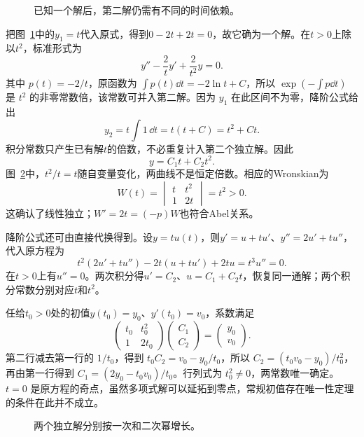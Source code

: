 \begin{figure}[H]\centering
{}
\caption{已知一个解后，第二解仍需有不同的时间依赖。}\label{fig:c2-h19-q}
\end{figure}
\begin{solution}
把图~\ref{fig:c2-h19-q}中的$y_1=t$代入原式，得到$0-2t+2t=0$，故它确为一个解。在$t>0$上除以$t^2$，标准形式为
\[y''-\frac2t y'+\frac2{t^2}y=0.\]
其中 $p(t)=-2/t$，原函数为 $\int p(t)\dd t=-2\ln t+C$，所以 $\exp(-\int p\dd t)$ 是 $t^2$ 的非零常数倍，该常数可并入第二解。因为 $y_1$ 在此区间不为零，降阶公式给出
\[y_2=t\int1\,\dd t=t(t+C)=t^2+Ct.
\]
积分常数只产生已有解$t$的倍数，不必重复计入第二个独立解。因此
\[\boxed{y=C_1t+C_2t^2}.
\]
图~\ref{fig:c2-h19-s}中，$t^2/t=t$随自变量变化，两曲线不是恒定倍数。相应的Wronskian为
\[W(t)=\begin{vmatrix}t&t^2\\1&2t\end{vmatrix}=t^2>0.\]
这确认了线性独立；$W'=2t=(-p)W$也符合Abel关系。

降阶公式还可由直接代换得到。设$y=tu(t)$，则$y'=u+tu'$、$y''=2u'+tu''$，代入原方程为
\[t^2(2u'+tu'')-2t(u+tu')+2tu=t^3u''=0.\]
在$t>0$上有$u''=0$。两次积分得$u'=C_2$、$u=C_1+C_2t$，恢复同一通解；两个积分常数分别对应$t$和$t^2$。

任给$t_0>0$处的初值$y(t_0)=y_0$、$y'(t_0)=v_0$，系数满足
\[\begin{pmatrix}t_0&t_0^2\\1&2t_0\end{pmatrix}
\begin{pmatrix}C_1\\C_2\end{pmatrix}=\begin{pmatrix}y_0\\v_0\end{pmatrix}.\]
第二行减去第一行的 $1/t_0$，得到 $t_0C_2=v_0-y_0/t_0$，所以 $C_2=(t_0v_0-y_0)/t_0^2$，再由第一行得到 $C_1=(2y_0-t_0v_0)/t_0$。行列式为 $t_0^2\ne0$，两常数唯一确定。$t=0$ 是原方程的奇点，虽然多项式解可以延拓到零点，常规初值存在唯一性定理的条件在此并不成立。

\begin{figure}[H]\centering
{}
\caption{两个独立解分别按一次和二次幂增长。}\label{fig:c2-h19-s}
\end{figure}
\end{solution}


